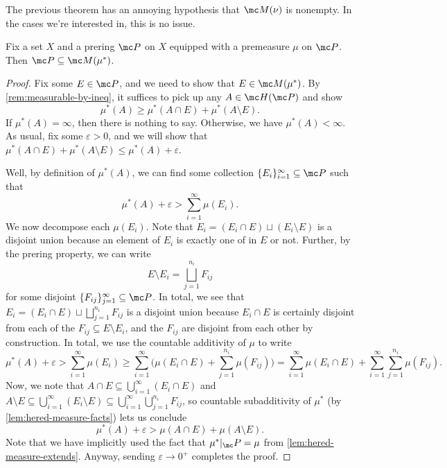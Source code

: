 \documentclass[../notes.tex]{subfiles}
\begin{document}
The previous theorem has an annoying hypothesis that $\mc M(\nu)$ is nonempty. In the cases we're interested in, this is no issue.
\begin{theorem} \label{thm:prering-is-measurable}
	Fix a set $X$ and a prering $\mc P$ on $X$ equipped with a premeasure $\mu$ on $\mc P$. Then $\mc P\subseteq\mc M(\mu^*)$.
\end{theorem}
\begin{proof}
	Fix some $E\in\mc P$, and we need to show that $E\in\mc M(\mu^*)$. By \autoref{rem:measurable-by-ineq}, it suffices to pick up any $A\in\mc H(\mc P)$ and show
	\[\mu^*(A)\ge\mu^*(A\cap E)+\mu^*(A\setminus E).\]
	If $\mu^*(A)=\infty$, then there is nothing to say. Otherwise, we have $\mu^*(A)<\infty$. As usual, fix some $\varepsilon>0$, and we will show that $\mu^*(A\cap E)+\mu^*(A\setminus E)\le\mu^*(A)+\varepsilon$.

	Well, by definition of $\mu^*(A)$, we can find some collection $\{E_i\}_{i=1}^\infty\subseteq\mc P$ such that
	\[\mu^*(A)+\varepsilon>\sum_{i=1}^\infty\mu(E_i).\]
	We now decompose each $\mu(E_i)$. Note that $E_i=(E_i\cap E)\sqcup(E_i\setminus E)$ is a disjoint union because an element of $E_i$ is exactly one of in $E$ or not. Further, by the prering property, we can write
	\[E\setminus E_i=\bigsqcup_{j=1}^{n_i}F_{ij}\]
	for some disjoint $\{F_{ij}\}_{j=1}^\infty\subseteq\mc P$. In total, we see that $E_i=(E_i\cap E)\sqcup\bigsqcup_{j=1}^{n_i}F_{ij}$ is a disjoint union because $E_i\cap E$ is certainly disjoint from each of the $F_{ij}\subseteq E\setminus E_i$, and the $F_{ij}$ are disjoint from each other by construction. In total, we use the countable additivity of $\mu$ to write
	\[\mu^*(A)+\varepsilon > \sum_{i=1}^\infty\mu(E_i) \ge \sum_{i=1}^\infty\Bigg(\mu(E_i\cap E)+\sum_{j=1}^{n_i}\mu(F_{ij})\Bigg)=\sum_{i=1}^\infty\mu(E_i\cap E)+\sum_{i=1}^\infty\sum_{j=1}^{n_i}\mu(F_{ij}).\]
	Now, we note that $A\cap E\subseteq\bigcup_{i=1}^\infty(E_i\cap E)$ and $A\setminus E\subseteq\bigcup_{i=1}^\infty(E_i\setminus E)\subseteq\bigcup_{i=1}^\infty\bigcup_{j=1}^{n_i}F_{ij}$, so countable subadditivity of $\mu^*$ (by \autoref{lem:hered-measure-facts}) lets us conclude
	\[\mu^*(A)+\varepsilon>\mu(A\cap E)+\mu(A\setminus E).\]
	Note that we have implicitly used the fact that $\mu^*|_\mc P=\mu$ from \autoref{lem:hered-measure-extends}. Anyway, sending $\varepsilon\to0^+$ completes the proof.
\end{proof}
\end{document}
